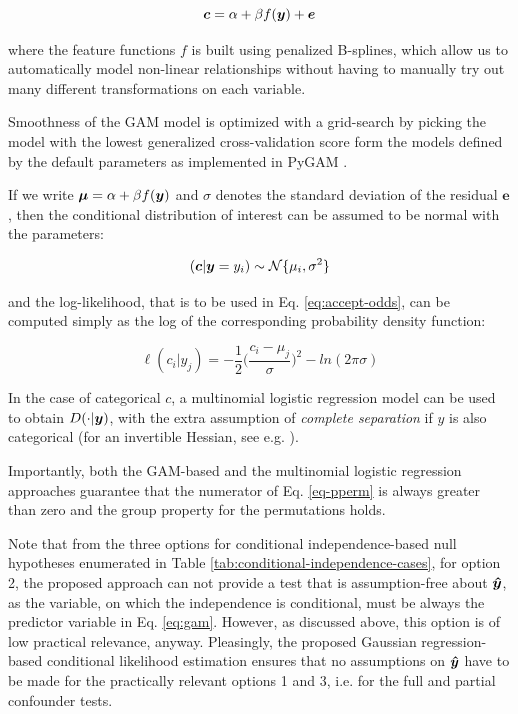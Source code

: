 \documentclass{article}
\begin{document}
\begin{equation}
    \label{eq:gam}
    \boldsymbol{c} = \alpha + \beta f(\boldsymbol{y}) + \boldsymbol{e}
\end{equation}

where the feature functions $f$ is built using penalized B-splines, which allow us to automatically model non-linear relationships without having to manually try out many different transformations on each variable.

Smoothness of the GAM model is optimized with a grid-search by picking the model with the lowest generalized cross-validation score form the models defined by the default parameters as implemented in PyGAM \citep{serven2018generalized}.

If we write $\boldsymbol{\mu} = \alpha + \beta f(\boldsymbol{y})$ and $\sigma$ denotes the standard deviation of the residual $\boldsymbol{e}$, then the conditional distribution of interest can be assumed to be normal with the parameters:

$$ (\boldsymbol{c}|\boldsymbol{y}=y_i) \sim \mathcal{N}\{\mu_i, \sigma^2\}$$

and the log-likelihood, that is to be used in Eq. \ref{eq:accept-odds}, can be computed simply as the log of the corresponding probability density function:

$$ \ell(c_i|y_j) = - \frac{1}{2} \Big(\frac{c_i-\mu_j}{\sigma}\Big)^2 - ln(2 \pi \sigma)   $$

In the case of categorical $c$, a multinomial logistic regression model can be used to obtain $D(\cdot|\boldsymbol{y})$, with the extra assumption of \emph{complete separation} if $y$ is also categorical (for an invertible Hessian, see e.g. \citep{bohning1992multinomial}).

Importantly, both the GAM-based and the multinomial logistic regression approaches guarantee that the numerator of Eq. \ref{eq-pperm} is always greater than zero and the group property for the permutations holds.

Note that from the three options for conditional independence-based null hypotheses enumerated in Table \ref{tab:conditional-independence-cases}, for option 2, the proposed approach can not provide a test that is assumption-free about $\boldsymbol{\hat{y}}$, as the variable, on which the independence is conditional, must be always the predictor variable in Eq. \ref{eq:gam}. However, as discussed above, this option is of low practical relevance, anyway.
Pleasingly,  the proposed Gaussian regression-based conditional likelihood estimation ensures that no assumptions on $\boldsymbol{\hat{y}}$ have to be made for the practically relevant options 1 and 3, i.e. for the full and partial confounder tests.
\end{document}
